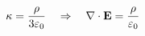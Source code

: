 \documentclass[preview]{standalone}
\begin{document}
\begin{align*}
\special{dvisvgm:raw <g id='unique000'>}\kappa=\frac{\rho}{3\varepsilon_0}\quad\Rightarrow\quad\nabla\cdot\mathbf E=\frac{\rho}{\varepsilon_0}\special{dvisvgm:raw </g>}
\end{align*}
\end{document}
